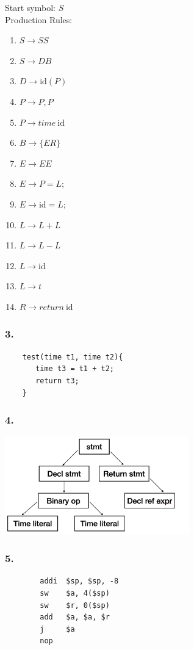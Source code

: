 \documentclass{article}
\begin{document}
	\noindent Start symbol: $S$\\
	
	\noindent Production Rules:	
	\begin{enumerate}[topsep=2pt,itemsep=3pt,parsep=0pt,partopsep=0pt]
		\item $S \rightarrow SS$
		\item $S \rightarrow DB$
		\item $D \rightarrow \text{id}(P)$
		\item $P \rightarrow P,P$
		\item $P \rightarrow time~\text{id}$
		\item $B \rightarrow \{ ER \}$
		\item $E \rightarrow EE$
		\item $E \rightarrow P = L; $
		\item $E \rightarrow \text{id} = L; $
		\item $L \rightarrow L+L$
		\item $L \rightarrow L-L$
		\item $L \rightarrow \text{id}$
		\item $L \rightarrow t$
		\item $R \rightarrow return~\text{id}$
	\end{enumerate}
	
	
	\subsubsection*{3.}
\begin{verbatim}
	test(time t1, time t2){
	   time t3 = t1 + t2;
	   return t3;
	}
\end{verbatim}
	

	\subsubsection*{4.}
	\begin{center}
		\includegraphics[width=0.6\textwidth]{ast}
	\end{center}

	\subsubsection*{5.}
	\begin{verbatim}
		addi  $sp, $sp, -8
		sw    $a, 4($sp)
		sw    $r, 0($sp)
		add   $a, $a, $r
		j     $a
		nop
		
	\end{verbatim}




	
\end{document}
